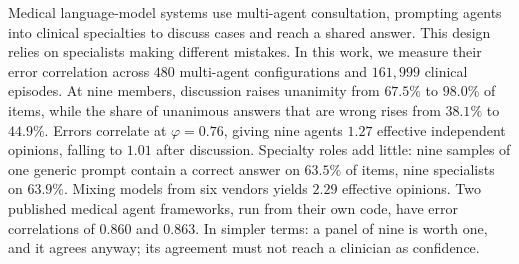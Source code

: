 Medical language-model systems use multi-agent consultation, prompting agents into clinical
specialties to discuss cases and reach a shared answer. This design relies on specialists making
different mistakes. In this work, we measure their error correlation across $480$ multi-agent
configurations and $161{,}999$ clinical episodes. At nine members, discussion raises unanimity
from $67.5\%$ to $98.0\%$ of items, while the share of unanimous answers that are wrong rises
from $38.1\%$ to $44.9\%$. Errors correlate at
$\varphi = 0.76$, giving nine agents $1.27$ effective independent opinions, falling to $1.01$
after discussion. Specialty roles add little: nine samples of one generic prompt contain a correct
answer on $63.5\%$ of items, nine specialists on $63.9\%$. Mixing models from six vendors yields $2.29$ effective opinions. Two published medical agent frameworks, run from their own code, have
error correlations of $0.860$ and $0.863$. In simpler terms: a panel of nine is worth one, and it
agrees anyway; its agreement must not reach a clinician as confidence.

